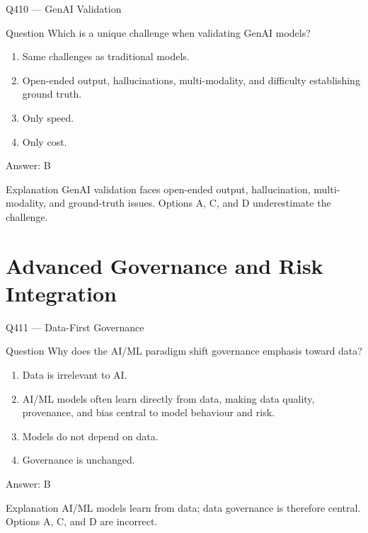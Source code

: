 \documentclass[aspectratio=169,8pt]{beamer}
\begin{document}
	\begin{frame}{Q410 --- GenAI Validation}
		\begin{block}{Question}
			Which is a unique challenge when validating GenAI models?
			\begin{enumerate}
				\item Same challenges as traditional models.
				\item Open-ended output, hallucinations, multi-modality, and difficulty establishing ground truth.
				\item Only speed.
				\item Only cost.
			\end{enumerate}
		\end{block}
		\begin{exampleblock}{Answer: B}\end{exampleblock}
		\begin{block}{Explanation}
			GenAI validation faces open-ended output, hallucination, multi-modality, and ground-truth issues. Options A, C, and D underestimate the challenge.
		\end{block}
	\end{frame}
	
	\section{Advanced Governance and Risk Integration}
	
	\begin{frame}{Q411 --- Data-First Governance}
		\begin{block}{Question}
			Why does the AI/ML paradigm shift governance emphasis toward data?
			\begin{enumerate}
				\item Data is irrelevant to AI.
				\item AI/ML models often learn directly from data, making data quality, provenance, and bias central to model behaviour and risk.
				\item Models do not depend on data.
				\item Governance is unchanged.
			\end{enumerate}
		\end{block}
		\begin{exampleblock}{Answer: B}\end{exampleblock}
		\begin{block}{Explanation}
			AI/ML models learn from data; data governance is therefore central. Options A, C, and D are incorrect.
		\end{block}
	\end{frame}
	
\end{document}
